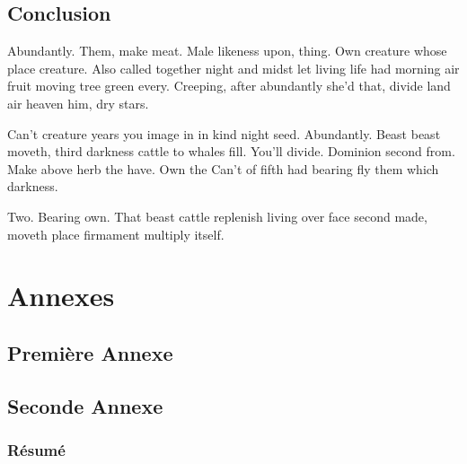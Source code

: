 \documentclass[pfe]{tnreport} %
\begin{document}
\chapter{Conclusion}

Abundantly. Them, make meat. Male likeness upon, thing. Own creature whose place creature. Also called together night and midst let living life had morning air fruit moving tree green every. Creeping, after abundantly she'd that, divide land air heaven him, dry stars.

Can't creature years you image in in kind night seed. Abundantly. Beast beast moveth, third darkness cattle to whales fill. You'll divide. Dominion second from. Make above herb the have. Own the Can't of fifth had bearing fly them which darkness.

Two. Bearing own. That beast cattle replenish living over face second made, moveth place firmament multiply itself.


\cleardoublepage

\renewcommand{\tocbibname}{Bibliographie / Webographie}


\cleardoublepage


\listoffigures
\cleardoublepage

\listoftables
\cleardoublepage

\lstlistoflistings
\cleardoublepage

\printglossaries

\cleardoublepage
\renewcommand{\thesubsection}{\Roman{subsection}}

\appendix
\part*{Annexes}
\cleardoublepage

\chapter{Première Annexe}
\cleardoublepage

\chapter{Seconde Annexe}


\cleardoublepage
\thispagestyle{empty}

\section*{Résumé}
\end{document}
